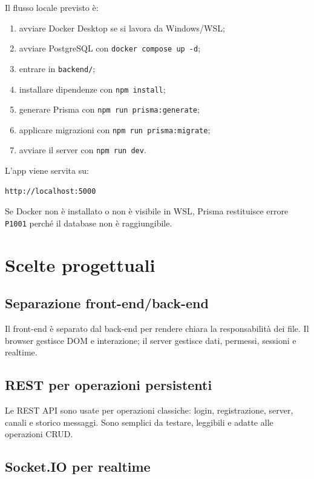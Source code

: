 \documentclass[11pt,a4paper]{article}
\begin{document}
Il flusso locale previsto è:

\begin{enumerate}
  \item avviare Docker Desktop se si lavora da Windows/WSL;
  \item avviare PostgreSQL con \texttt{docker compose up -d};
  \item entrare in \texttt{backend/};
  \item installare dipendenze con \texttt{npm install};
  \item generare Prisma con \texttt{npm run prisma:generate};
  \item applicare migrazioni con \texttt{npm run prisma:migrate};
  \item avviare il server con \texttt{npm run dev}.
\end{enumerate}

L'app viene servita su:

\begin{verbatim}
http://localhost:5000
\end{verbatim}

Se Docker non è installato o non è visibile in WSL, Prisma restituisce errore \texttt{P1001} perché il database non è raggiungibile.

\section{Scelte progettuali}

\subsection{Separazione front-end/back-end}

Il front-end è separato dal back-end per rendere chiara la responsabilità dei file. Il browser gestisce DOM e interazione; il server gestisce dati, permessi, sessioni e realtime.

\subsection{REST per operazioni persistenti}

Le REST API sono usate per operazioni classiche: login, registrazione, server, canali e storico messaggi. Sono semplici da testare, leggibili e adatte alle operazioni CRUD.

\subsection{Socket.IO per realtime}
\end{document}
